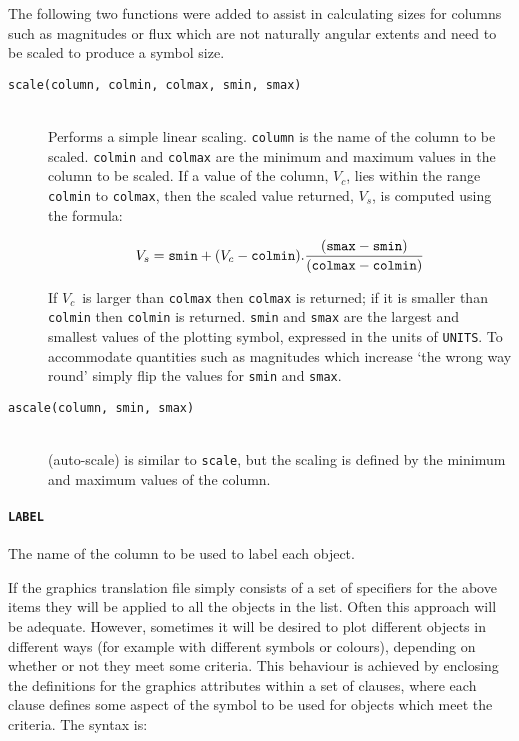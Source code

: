 \documentclass[twoside,11pt]{article}
\renewcommand{\_}{\texttt{\symbol{95}}}
\begin{document}
The following two functions were added to assist in calculating sizes for
columns such as magnitudes or flux which are not naturally angular extents
and need to be scaled to produce a symbol size.

\begin{description}

  \item[{\tt scale(column, colmin, colmax, smin, smax)}] ~ 
  \\ Performs a simple linear scaling.  {\tt column} is the name of
   the column to be scaled.  {\tt colmin} and {\tt colmax} are the
   minimum and maximum values in the column to be scaled.  If a
   value of the column, $V_{c}$, lies within the range {\tt colmin}
   to {\tt colmax}, then the scaled value returned, $V_{s}$, is
   computed using the formula:

  \begin{equation}
   V_{s} = {\tt smin} + (V_{c} - {\tt colmin}) .
   \frac{({\tt smax} - {\tt smin} ) }{({\tt colmax} - {\tt colmin} ) }
  \end{equation}

   If $V_{c}$\, is larger than {\tt colmax} then {\tt colmax} is
   returned; if it is smaller than {\tt colmin} then {\tt colmin} is
   returned.  {\tt smin} and {\tt smax} are the largest and smallest
   values of the plotting symbol, expressed in the units of {\tt UNITS}.
   To accommodate quantities such as magnitudes which increase `the
   wrong way round' simply flip the values for {\tt smin} and {\tt smax}.

  \item[{\tt ascale(column, smin, smax)}] ~
  \\ (auto-scale) is similar to {\tt scale}, but the scaling is defined by
   the minimum and maximum values of the column.

\end{description}

\paragraph{{\tt LABEL}} The name of the column to be used to label each object.

\vspace{5mm}

If the graphics translation file simply consists of a set of specifiers
for the above items they will be applied to all the objects in the list.
Often this approach will be adequate.  However, sometimes it will be
desired to plot different objects in different ways (for example with
different symbols or colours), depending on whether or not they meet
some criteria.  This behaviour is achieved by enclosing the definitions
for the graphics attributes within a set of clauses, where each clause
defines some aspect of the symbol to be used for objects which meet the
criteria.  The syntax is:
\end{document}
